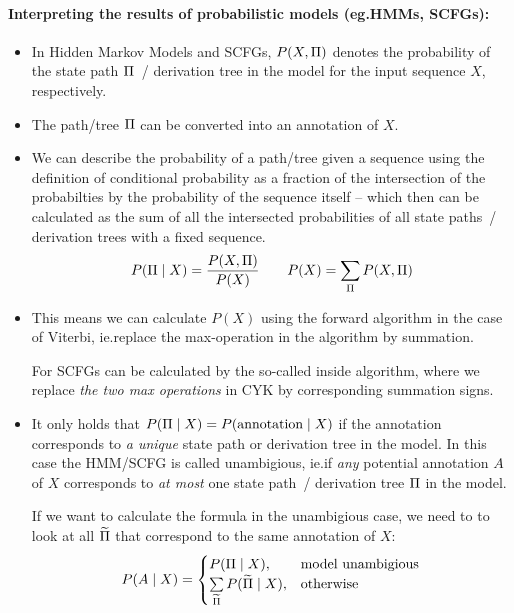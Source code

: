 \paragraph{Interpreting the results of probabilistic models (eg.\@ HMMs, SCFGs):}

\begin{itemize}
\item In Hidden Markov Models and SCFGs, \(P(X,\Pi)\) denotes the probability
  of the state path \(\Pi\)~/ derivation tree in the model for the input
  sequence \(X\), respectively.
\item The path/tree \(\Pi\) can be converted into an annotation of \(X\).
\item We can describe the probability of a path/tree given a sequence using the
  definition of conditional probability as a fraction of the intersection
  of the probabilties by the probability of the sequence itself -- which then
  can be calculated as the sum of all the intersected probabilities of all
  state paths~/ derivation trees with a fixed sequence.
  \[
    P(\Pi \mid X) = \frac{P(X,\Pi)}{P(X)} \qquad
    P(X) = \sum_{\Pi} P(X,\Pi)
  \]
\item This means we can calculate \(P(X)\) using the forward algorithm in the
  case of Viterbi, ie.\@ replace the max-operation in the algorithm by
  summation.

  For SCFGs can be calculated by the so-called inside algorithm, where we
  replace \emph{the two max operations} in CYK by corresponding summation
  signs.
\item It only holds that \(P(\Pi\mid X) = P(\text{annotation} \mid X)\) if
  the annotation corresponds to \emph{a unique} state path or
  derivation tree in the model.  In this case the HMM/SCFG is called
  unambigious, ie.\@ if \emph{any} potential annotation \(A\) of \(X\)
  corresponds to \emph{at most} one state path~/ derivation tree \(\Pi\) in
  the model.

  If we want to calculate the formula in the unambigious case, we need to  to
  look at all \(\widetilde{\Pi}\) that correspond to the same annotation of
  \(X\):
  \[
    P(A\mid X) = \begin{cases}
        P(\Pi \mid X), &\text{model unambigious} \\
        \sum\limits_{\widetilde{\Pi}} P(\widetilde{\Pi} \mid X), &\text{otherwise}
    \end{cases}
  \]
\end{itemize}

